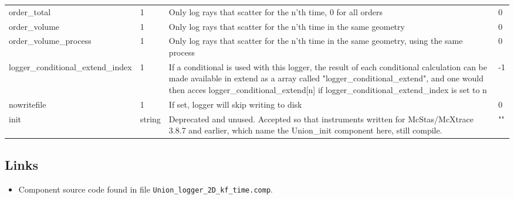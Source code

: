 \begin{longtable}{p{}p{}p{}p{}}
order\_total & 1 & Only log rays that scatter for the n'th time, 0 for all orders & 0 \\
order\_volume & 1 & Only log rays that scatter for the n'th time in the same geometry & 0 \\
order\_volume\_process & 1 & Only log rays that scatter for the n'th time in the same geometry, using the same process & 0 \\
logger\_conditional\_extend\_index & 1 & If a conditional is used with this logger, the result of each conditional calculation can be made available in extend as a array called "logger\_conditional\_extend", and one would then acces logger\_conditional\_extend[n] if logger\_conditional\_extend\_index is set to n & -1 \\
nowritefile & 1 & If set, logger will skip writing to disk & 0 \\
init & string & Deprecated and unused. Accepted so that instruments written for McStas/McXtrace 3.8.7 and earlier, which name the Union\_init component here, still compile. & "" \\
\bottomrule
\end{longtable}

\subsection*{Links}
\begin{itemize}
  \item Component source code found in file \texttt{Union\_logger\_2D\_kf\_time.comp}.
\end{itemize}
